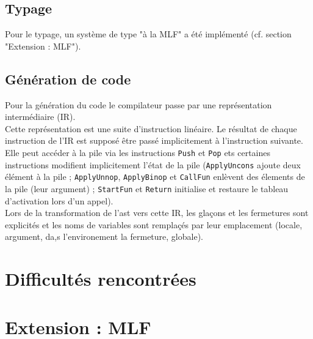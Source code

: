 \documentclass[a4paper]{article}
\begin{document}
\subsection{Typage}
Pour le typage, un système de type "à la MLF" a été implémenté (cf. section "Extension : MLF").

\subsection{Génération de code}
Pour la génération du code le compilateur passe par une représentation intermédiaire (IR). \\
Cette représentation est une suite d'instruction linéaire. Le résultat de chaque instruction de l'IR est supposé être passé implicitement à l'instruction suivante. \\
Elle peut accéder à la pile via les instructions \texttt{Push} et \texttt{Pop} ets certaines instructions modifient implicitement l'état de la pile (\texttt{ApplyUncons} ajoute deux élément à la pile ; \texttt{ApplyUnnop}, \texttt{ApplyBinop} et \texttt{CallFun} enlèvent des élements de la pile (leur argument) ; \texttt{StartFun} et \texttt{Return} initialise et restaure le tableau d'activation lors d'un appel). \\
Lors de la transformation de l'ast vers cette IR, les glaçons et les fermetures sont explicités et les noms de variables sont remplaçés par leur emplacement (locale, argument, da,s l'environement la fermeture, globale).


\section{Difficultés rencontrées}

\section{Extension : MLF}
\end{document}
